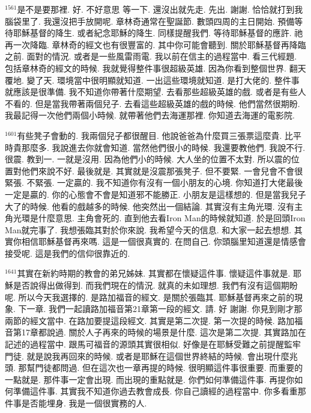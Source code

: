 \documentclass{book}
\begin{document}
$^{1561}$是不是要那裡.
好.
不好意思 等一下.
還沒出就先走.
先出.
謝謝.
恰恰就打到我腦袋里了.
我還沒把手放開呢.
章林奇通常在聖誕節.
數頭四周的主日開始.
預備等待耶穌基督的降生.
或者紀念耶穌的降生.
同樣提醒我們.
等待耶穌基督的應許.
祂再一次降臨.
章林奇的經文也有很豐富的.
其中你可能會聽到.
關於耶穌基督再降臨之前.
面對的情況.
或者是一些風雷雨電.
我以前在信主的過程當中.
看三代經題.
包括章林奇的經文的時候.
我就覺得整件事很超級英雄.
因為你看到整個世界.
翻天覆地.
變了天.
環境當中很明顯就知道.
一出這些環境就知道.
是打大佬的.
整件事就應該是很準備.
我不知道你帶著什麼期望.
去看那些超級英雄的戲.
或者是有些人不看的.
但是當我帶著兩個兒子.
去看這些超級英雄的戲的時候.
他們當然很期盼.
我最記得一次他們兩個小時候.
就帶著他們去海運那裡.
你知道去海運的電影院.

$^{1601}$有些凳子會動的.
我兩個兒子都很醒目.
他說爸爸為什麼買三張票這麼貴.
比平時貴那麼多.
我說進去你就會知道.
當然他們很小的時候.
我還要教他們.
我說不行.
很震.
教到一.
一就是沒用.
因為他們小的時候.
大人坐的位置不太對.
所以震的位置對他們來說不好.
最後就是.
其實就是沒震那張凳子.
但不要緊.
一會兒會不會很緊張.
不緊張.
一定贏的.
我不知道你有沒有一個小朋友的心境.
你知道打大佬最後一定是贏的.
你的心態會不會是知道邪不能勝正.
小朋友是這樣想的.
但是當我兒子大了的時候.
他看的戲越多的時候.
他突然出一個結論.
其實沒有主角光環.
沒有主角光環是什麼意思.
主角會死的.
直到他去看Iron Man的時候就知道.
於是回頭Iron Man就完事了.
我想張臨其對於你來說.
我希望今天的信息.
和大家一起去想想.
其實你相信耶穌基督再來嗎.
這是一個很真實的.
在問自己.
你頭腦里知道還是情感會接受呢.
這是我們的信仰很靠近的.

$^{1641}$其實在新約時期的教會的弟兄姊妹.
其實都在懷疑這件事.
懷疑這件事就是.
耶穌是否說得出做得到.
而我們現在的情況.
就真的未如理想.
我們有沒有這個期盼呢.
所以今天我選擇的.
是路加福音的經文.
是關於張臨其.
耶穌基督再來之前的現象.
下一章.
我們一起讀路加福音第21章第一段的經文.
請.
好 謝謝.
你見到剛才那兩節的經文當中.
在路加要提這段經文.
其實是第二次提.
第一次提的時候.
路加福音第17章都說過.
關於人子再來的時候的場景是什麼.
這次是第二次提.
其實路加在記述的過程當中.
跟馬可福音的源頭其實很相似.
好像是在耶穌受難之前提醒監牢門徒.
就是說我再回來的時候.
或者是耶穌在這個世界終結的時候.
會出現什麼兆頭.
那幫門徒都問過.
但在這次也一章再提的時候.
很明顯這件事很重要.
而重要的一點就是.
那件事一定會出現.
而出現的重點就是.
你們如何準備這件事.
再提你如何準備這件事.
其實我不知道你過去教會成長.
你自己讀經的過程當中.
你多看重那件事是否能埋身.
我是一個很實務的人.
\end{document}
